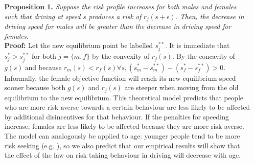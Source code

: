 \textbf{Proposition 1.} {\it Suppose the risk profile increases for both males and females such that driving at speed $s$ produces a risk of $r_j (s+\epsilon)$. Then, the decrease in driving speed for males will be greater than the decrease in driving speed for females.} \\

\textbf{Proof:} Let the new equilibrium point be labelled $s_j^{**}$. It is immediate that $s_j^*>s_j^{**}$ for both $j=\{m,f\}$ by the convexity of $r_j (s)$. By the concavity of $g(s)$ and because $r_m (s)<r_f (s)  \forall s, (s_m^*-s_m^{**} ) - (s_f^*-s_f^{**})>0$. \\

Informally, the female objective function will reach its new equilibrium speed sooner because both $g(s)$ and $r_j (s)$ are steeper when moving from the old equilibrium to the new equilibrium.
This theoretical model predicts that people who are more risk averse towards a certain behaviour are less likely to be affected by additional disincentives for that behaviour. If the penalties for speeding increase, females are less likely to be affected because they are more risk averse. The model can analogously be applied to age: younger people tend to be more risk seeking 
(e.g. \citet{gongyang2012}), 
so we also predict that our empirical results will show that the effect of the law on risk taking behaviour in driving will decrease with age.

